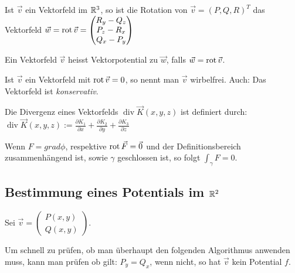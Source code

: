 \begin{definition}
Ist $\vec{v}$ ein Vektorfeld im $\mathbb{R}^3$, so ist die Rotation von $\vec{v} = (P, Q, R)^T$ das Vektorfeld
$\vec{w} = \operatorname{rot} \vec{v} = \begin{pmatrix}
R_y - Q_z\\
P_z - R_x\\
Q_x - P_y
\end{pmatrix}$
\end{definition}

\begin{definition}[Vektorpotential]
Ein Vektorfeld $\vec{v}$ heisst Vektorpotential zu $\vec{w}$, falls $\vec{w} = \operatorname{rot} \vec{v}$.
\end{definition}

\begin{definition}
Ist $\vec{v}$ ein Vektorfeld mit $\operatorname{rot} \vec{v} = 0$, so nennt man $\vec{v}$ wirbelfrei. Auch: Das Vektorfeld ist \emph{konservativ}.
\end{definition}

\begin{definition}[Divergenz]
Die Divergenz eines Vektorfelds $\operatorname{div} \vec{K}(x,y,z)$ ist definiert durch:
$\operatorname{div} \vec{K}(x,y,z) := \frac{\partial
K_1}{\partial x} + \frac{\partial K_2}{\partial y} + \frac{\partial
K_3}{\partial z}$
\end{definition}

\begin{lemma}
Wenn $F = grad \phi$, respektive $\operatorname{rot} \vec{F} =\vec{0}$ und der Definitionsbereich zusammenhängend ist,
sowie $\gamma$ geschlossen ist, so folgt $\int_\gamma F = 0$.
\end{lemma}

\subsection{Bestimmung eines Potentials im $\mathbb{R}^2$}
Sei $\vec{v} = \begin{pmatrix}
P(x,y)\\
Q(x,y)
\end{pmatrix}$.

Um schnell zu prüfen, ob man überhaupt den folgenden Algorithmus anwenden muss,
kann man prüfen ob gilt: $P_y = Q_x$, wenn nicht, so hat $\vec{v}$ kein Potential $f$.

